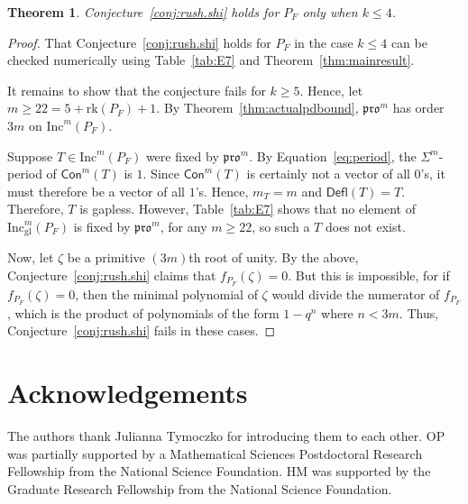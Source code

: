 \documentclass[12pt]{amsart}
\newtheorem{theorem}{Theorem}[section]
\theoremstyle{definition}
\theoremstyle{remark}
\numberwithin{equation}{section}
\newcommand{\inc}{\ensuremath{\mathrm{Inc}}}
\newcommand{\incgl}{\inc_{\mathrm{gl}}}
\newcommand{\pro}{\mathfrak{pro}}
\newcommand{\rank}{\ensuremath{\mathrm{rk}}}
\newcommand{\deflate}{\ensuremath{\mathsf{Defl}}}
\newcommand{\content}{\ensuremath{\mathsf{Con}}}
\begin{document}
\begin{theorem}\label{thm:F_bad}
Conjecture~\ref{conj:rush.shi} holds for $P_F$ only when $k \leq 4$.
\end{theorem}
\begin{proof}
That Conjecture~\ref{conj:rush.shi} holds for $P_F$ in the case $k \leq 4$ can be checked numerically using Table~\ref{tab:E7} and Theorem~\ref{thm:mainresult}.

It remains to show that the conjecture fails for $k \geq 5$. Hence, let $m \geq 22 = 5 +  \rank(P_F) + 1$. By Theorem~\ref{thm:actualpdbound}, $\pro^m$ has order $3m$ on $\inc^m(P_F)$. 

Suppose $T \in \inc^m(P_F)$ were fixed by $\pro^m$.  By Equation~\ref{eq:period}, the $\Sigma^m$-period of $\content^m(T)$ is $1$. Since $\content^m(T)$ is certainly not a vector of all $0$'s, it must therefore be a vector of all $1$'s. Hence, $m_T = m$ and $\deflate(T) = T$. Therefore, $T$ is gapless. However, Table~\ref{tab:E7} shows that no element of $\incgl^m(P_F)$ is fixed by $\pro^m$, for any $m \geq 22$, so such a $T$ does not exist.


Now, let $\zeta$ be a primitive $(3m)$th root of unity. By the above, Conjecture~\ref{conj:rush.shi} claims that $f_{P_F}(\zeta) = 0$. But this is impossible, for if $f_{P_F}(\zeta) = 0$, then the minimal polynomial of $\zeta$ would divide the numerator of $f_{P_F}$, which is the product of polynomials of the form $1-q^n$ where $n < 3m$. Thus, Conjecture~\ref{conj:rush.shi} fails in these cases. 
\end{proof}

\section*{Acknowledgements}
The authors thank Julianna Tymoczko for introducing them to each other. OP was partially supported by a Mathematical Sciences Postdoctoral Research Fellowship from the National Science Foundation. HM was supported by the Graduate Research Fellowship from the National Science Foundation. 


%
%


 

\end{document}
